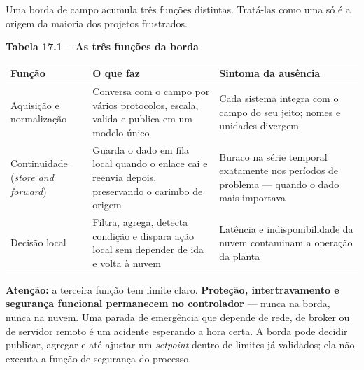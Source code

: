 Uma borda de campo acumula três funções distintas. Tratá-las como uma só é a origem da maioria dos
projetos frustrados.

\textbf{Tabela 17.1 -- As três funções da borda}

\begin{longtable}[]{@{}
  >{\raggedright\arraybackslash}p{}
  >{\raggedright\arraybackslash}p{}
  >{\raggedright\arraybackslash}p{}@{}}
\toprule\noalign{}
\begin{minipage}[b]{\linewidth}\raggedright
Função
\end{minipage} & \begin{minipage}[b]{\linewidth}\raggedright
O que faz
\end{minipage} & \begin{minipage}[b]{\linewidth}\raggedright
Sintoma da ausência
\end{minipage} \\
\midrule\noalign{}
\endhead
\bottomrule\noalign{}
\endlastfoot
Aquisição e normalização & Conversa com o campo por vários protocolos, escala, valida e publica em um modelo único & Cada sistema integra com o campo do seu jeito; nomes e unidades divergem \\
Continuidade (\emph{store and forward}) & Guarda o dado em fila local quando o enlace cai e reenvia depois, preservando o carimbo de origem & Buraco na série temporal exatamente nos períodos de problema --- quando o dado mais importava \\
Decisão local & Filtra, agrega, detecta condição e dispara ação local sem depender de ida e volta à nuvem & Latência e indisponibilidade da nuvem contaminam a operação da planta \\
\end{longtable}

\begin{caixaatencao}

\textbf{Atenção:} a terceira função tem limite claro. \textbf{Proteção, intertravamento e segurança
funcional permanecem no controlador} --- nunca na borda, nunca na nuvem. Uma parada de emergência
que depende de rede, de broker ou de servidor remoto é um acidente esperando a hora certa. A borda
pode decidir publicar, agregar e até ajustar um \emph{setpoint} dentro de limites já validados; ela não
executa a função de segurança do processo.

\end{caixaatencao}

